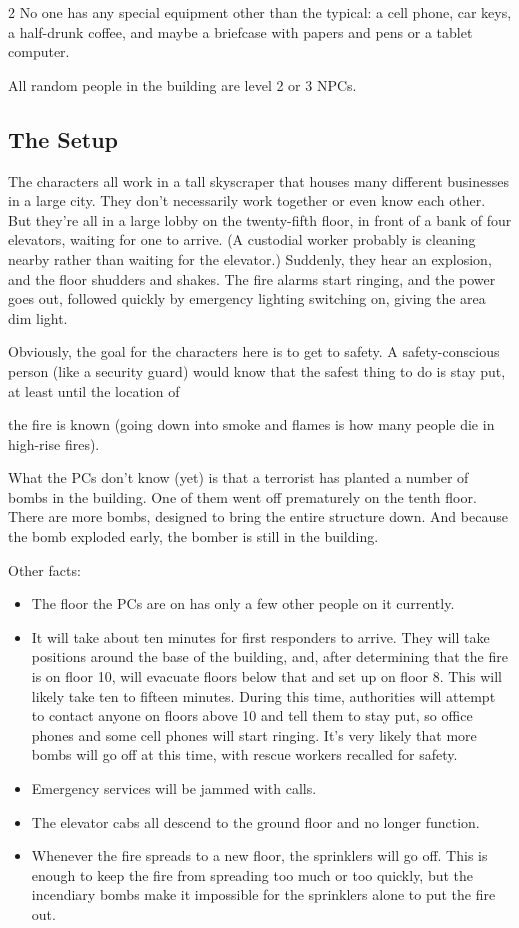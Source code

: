 \begin{multicols}{2}
No one has any special equipment other than the typical: a cell phone, car keys, a half-drunk coffee, and maybe a briefcase with papers and pens or a tablet computer.

All random people in the building are level 2 or 3 NPCs.

\subsection{The Setup}

The characters all work in a tall skyscraper that houses many different businesses in a large city. They don’t necessarily work together or even know each other. But they’re all in a large lobby on the twenty-fifth floor, in front of a bank of four elevators, waiting for one to arrive. (A custodial worker probably is cleaning nearby rather than waiting for the elevator.) Suddenly, they hear an explosion, and the floor shudders and shakes. The fire alarms start ringing, and the power goes out, followed quickly by emergency lighting switching on, giving the area dim light.

Obviously, the goal for the characters here is to get to safety. A safety-conscious person (like a security guard) would know that the safest thing to do is stay put, at least until the location of

the fire is known (going down into smoke and flames is how many people die in high-rise fires).

What the PCs don’t know (yet) is that a terrorist has planted a number of bombs in the building. One of them went off prematurely on the tenth floor. There are more bombs, designed to bring the entire structure down. And because the bomb exploded early, the bomber is still in the building.

Other facts:

\begin{itemize}
\item The floor the PCs are on has only a few other people on it currently.
\item It will take about ten minutes for first responders to arrive. They will take positions around the base of the building, and, after determining that the fire is on floor 10, will evacuate floors below that and set up on floor 8. This will likely take ten to fifteen minutes. During this time, authorities will attempt to contact anyone on floors above 10 and tell them to stay put, so office phones and some cell phones will start ringing. It’s very likely that more bombs will go off at this time, with rescue workers recalled for safety.
\item Emergency services will be jammed with calls. \item The elevator cabs all descend to the ground floor and no longer function.
\item Whenever the fire spreads to a new floor, the sprinklers will go off. This is enough to keep the fire from spreading too much or too quickly, but the incendiary bombs make it impossible for the sprinklers alone to put the fire out.
\end{itemize}


\end{multicols}
